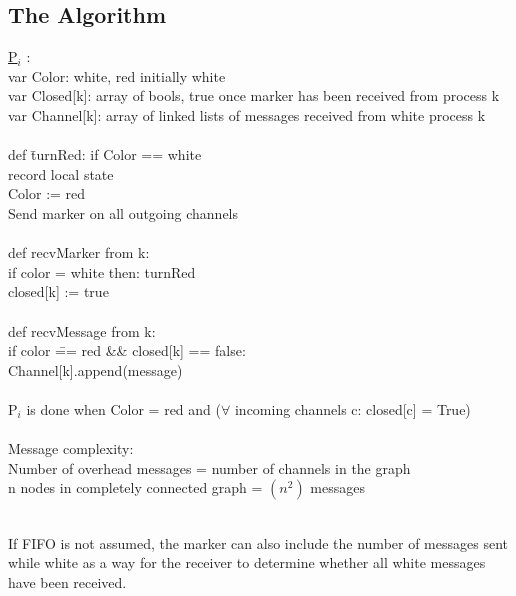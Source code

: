 \documentclass[twoside]{article}
\begin{document}
\subsection{The Algorithm}
\begin{tabbing}
\underline{P$_{i}$} :\= \\
\> var Color: {white, red} initially white\\
\> var Closed[k]: array of bools, true once marker has been received from process k\\
\> var Channel[k]: array of linked lists of messages received from white process k\\
\\
\> def \= turnRed: if Color == white\\
\> \> record local state\\
\> \> Color := red\\
\> \> Send marker on all outgoing channels\\
\\
\> def recvMarker from k: \\
\> \> if color = white then: turnRed \\
\> \> closed[k] := true\\
\\
\> def recvMessage from k:\\
\> \> if color \= == red \&\& closed[k] == false:\\
\> \> \> Channel[k].append(message)\\
\\
P$_{i}$ is done when Color = red and ($\forall$ incoming channels c: closed[c] = True)\\
\\
Message complexity:\\
\> Number of overhead messages = number of channels in the graph\\
\> n nodes in completely connected graph = $(n^{2})$ messages\\
\\
\end{tabbing}
If FIFO is not assumed, the marker can also include the number of messages sent while white as a way for the receiver to determine whether all white messages have been received.
\end{document}
